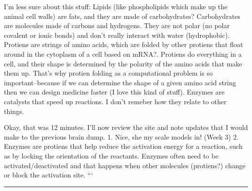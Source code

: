 \documentclass[letterpaper]{article}
\begin{document}
I'm less sure about this stuff: Lipids (like phospholipids which make up
the animal cell walls) are fats, and they are made of carbohydrates?
Carbohydrates are molecules made of carbons and hydrogens. They are not
polar (no polar covalent or ionic bonds) and don't really interact with
water (hydrophobic). Protiens are strings of amino acids, which are
folded by other protiens that float around in the cytoplasm of a cell
based on mRNA?. Protiens do everything in a cell, and their shape is
determined by the polarity of the amino acids that make them up. That's
why protien folding as a computational problem is so important--because
if we can determine the shape of a given amino acid string then we can
design medicine faster (I love this kind of stuff). Enzymes are
catalysts that speed up reactions. I don't remeber how they relate to
other things.

Okay, that was 12 minutes. I'll now review the site and note updates
that I would make to the previous brain dump. 1. Nice, she my scale
models in! (Week 3) 2. Enzymes are protiens that help reduce the
activation energy for a reaction, such as by locking the orientation of
the reactants. Enzymes often need to be activated/deactivated and that
happens when other molecules (protiens?) change or block the activation
site. ```

\noindent\rule{\textwidth}{0.5pt}
\end{document}
